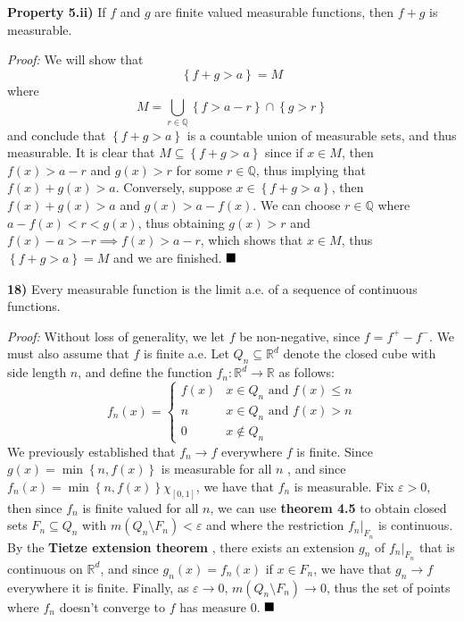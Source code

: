 \documentclass[12pt]{article}
\newcommand{\Q}{\ensuremath{\mathbb{Q}}}
\newcommand{\R}{\ensuremath{\mathbb{R}}}
\newcommand{\e}{\ensuremath{\varepsilon}}
\newcommand{\braceb}[1]{\left\{#1\right\}}
\newcommand{\sdiff}{\setminus}
\newcommand{\proof}{\textit{Proof: }}
\newcommand{\done}{\ensuremath{\strut\hfill\blacksquare}}
\renewcommand{\t}[1]{\text{ #1 }}
\begin{document}
\pagestyle{fancy}

\setlength{\parindent}{0in}
\setlength{\parskip}{0.1in}

\textbf{Property 5.ii)}
If \( f \) and \( g \) are finite valued measurable functions, then \( f + g \)
is measurable.

\proof
We will show that
\[
	\braceb{f + g > a}
	= M
\]
where
\[
	M = \bigcup_{r \in \Q} \braceb{f > a - r} \cap \braceb{g > r}
\]
and conclude that \( \braceb{f + g > a} \) is a countable union of measurable
sets, and thus measurable.
It is clear that \( M \subseteq \braceb{f + g > a} \) since if \( x \in M \),
then \( f(x) > a - r \) and \( g(x) > r \) for some \( r \in \Q \), thus
implying that \( f(x) + g(x) > a \).
Conversely, suppose \( x \in \braceb{f + g > a} \), then
\( f(x) + g(x) > a \) and \( g(x) > a - f(x) \).
We can choose \( r \in \Q \) where \( a - f(x) < r < g(x) \), thus obtaining
\( g(x) > r \) and \( f(x) - a > -r \implies f(x) > a - r \), which shows
that \( x \in M \), thus \( \braceb{f + g > a} = M \) and we are finished.
\done

\textbf{18)}
Every measurable function is the limit a.e. of a sequence of
continuous functions.

\proof
Without loss of generality, we let \( f \) be non-negative, since
\( f = f^+ - f^- \).
We must also assume that \( f \) is finite a.e.
Let \( Q_n \subseteq \R^d \) denote the closed cube with side length \( n \),
and
define the function \( f_n : \R^d \to \R \) as follows:
\[
	f_n(x)
	= \begin{cases}
		f(x) & x \in Q_n \t{and} f(x) \leq n \\
		n    & x \in Q_n \t{and} f(x) > n \\
		0    & x \notin Q_n
	\end{cases}
\]
We previously established that \( f_n \to f \) everywhere \( f \) is finite.
Since \( g(x) = \min\braceb{n,f(x)} \) is measurable for all \( n \)
\cite{MinMeasurable},
and since \( f_n(x) = \min\braceb{n,f(x)}\chi_{[0,1]} \), we have that \( f_n \)
is measurable.
Fix \( \e > 0 \), then since \( f_n \) is finite valued for all \( n \), we can
use \textbf{theorem 4.5} to obtain closed sets \( F_n \subseteq Q_n \) with
\( m(Q_n \sdiff F_n) < \e \) and where the restriction \( f_n |_{F_n} \) is
continuous.
By the \textbf{Tietze extension theorem}
\cite{TietzeExtension}, there exists an extension
\( g_n \) of \( f_n |_{F_n} \) that is continuous on \( \R^d \), and since
\( g_n(x) = f_n(x) \) if \( x \in F_n \), we have that \( g_n \to f \)
everywhere it is finite.
Finally, as \( \e \to 0 \), \( m(Q_n \sdiff F_n) \to 0 \), thus the set of
points where \( f_n \) doesn't converge to \( f \) has measure 0.
\done
\end{document}

